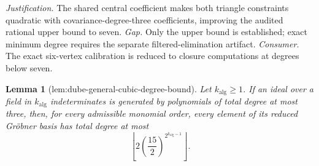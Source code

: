 \documentclass{article}
\newtheorem{lemma}{Lemma}
\begin{document}
\par\smallskip\noindent \textit{Justification.} The shared central coefficient makes both triangle constraints quadratic with covariance-degree-three coefficients, improving the audited rational upper bound to seven. \textit{Gap.} Only the upper bound is established; exact minimum degree requires the separate filtered-elimination artifact. \textit{Consumer.} The exact six-vertex calibration is reduced to closure computations at degrees below seven.

\begin{lemma}[lem:dube-general-cubic-degree-bound]\label{lem:dube-general-cubic-degree-bound}
Let \(k_{\mathrm{alg}}\geq 1\).  If an ideal over a field in \(k_{\mathrm{alg}}\) indeterminates is generated by polynomials of total degree at most three, then, for every admissible monomial order, every element of its reduced Gr\"obner basis has total degree at most
\[
 \left\lfloor
 2\left(\frac{15}{2}\right)^{2^{k_{\mathrm{alg}}-1}}
 \right\rfloor.
\]
\end{lemma}
\end{document}
